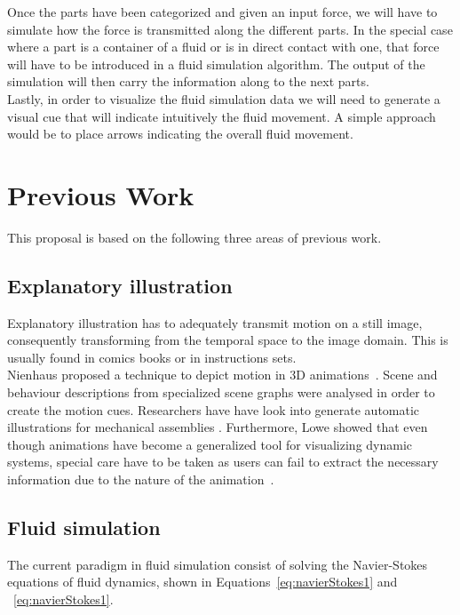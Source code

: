 \documentclass[11pt]{report}
\begin{document}
Once the parts have been categorized and given an input force, we will have to simulate how the force is transmitted along the different parts.
In the special case where a part is a container of a fluid or is in direct contact with one, that force will have to be introduced in a fluid simulation algorithm.
The output of the simulation will then carry the information along to the next parts.\\

Lastly, in order to visualize the fluid simulation data we will need to generate a visual cue that will indicate intuitively the fluid movement.
A simple approach would be to place arrows indicating the overall fluid movement.

\section{Previous Work}

This proposal is based on the following three areas of previous work.

\subsection{Explanatory illustration}

Explanatory illustration has to adequately transmit motion on a still image, consequently transforming from the temporal space to the image domain.
This is usually found in comics books or in instructions sets.\\

Nienhaus proposed a technique to depict motion in 3D animations~\cite{Nienhaus2005}.
Scene and behaviour descriptions from specialized scene graphs were analysed in order to create the motion cues.  
Researchers have have look into generate automatic illustrations for mechanical assemblies \cite{Mitra2010}.
Furthermore, Lowe showed that even though animations have become a generalized tool for visualizing dynamic systems, special care have to be taken as users can fail to extract the necessary information due to the nature of the animation~\cite{Lowe2014}.


\subsection{Fluid simulation}
\label{prevWorkFluidSim}

The current paradigm in fluid simulation consist of solving the Navier-Stokes equations of fluid dynamics, shown in Equations~\ref{eq:navierStokes1} and  ~\ref{eq:navierStokes1}.
\end{document}
